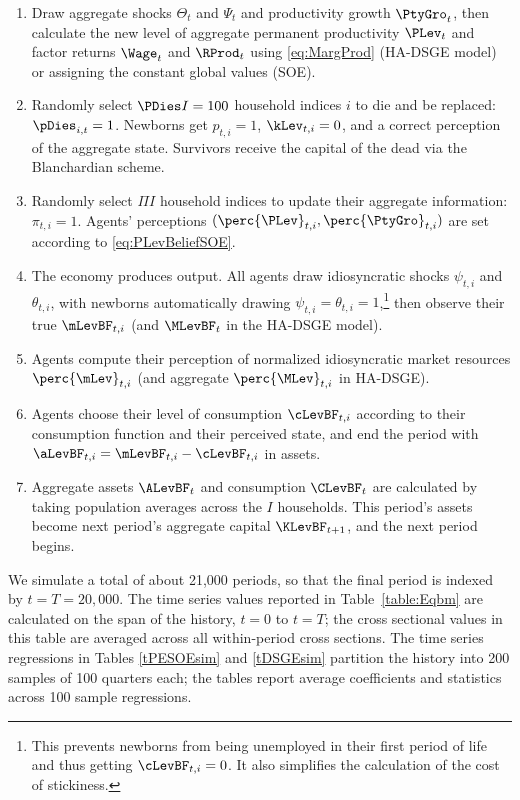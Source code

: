 \begin{enumerate}
\item Draw aggregate shocks $\Theta_t$ and $\Psi_t$ and productivity growth $\PtyGro_t$, then calculate
the new level of aggregate permanent productivity $\PLev_t$ and factor returns $\Wage_t$ and $\RProd_t$
using \eqref{eq:MargProd} (HA-DSGE model) or assigning the constant global values (SOE).

\item Randomly select $\PDies I = 100$ household indices $i$ to die and be replaced: $\pDies_{i,t}=1$.
Newborns get $p_{t,i} = 1$, $\kLev_{t,i} = 0$, and a correct perception of the aggregate state.
Survivors receive the capital of the dead via the Blanchardian scheme.

\item Randomly select $\Pi I$ household indices to update their aggregate information: $\pi_{t,i}=1$.
Agents' perceptions  $(\perc{\PLev}_{t,i},\perc{\PtyGro}_{t,i})$ are set according to \eqref{eq:PLevBeliefSOE}.

\item The economy produces output. All agents draw idiosyncratic shocks $\psi_{t,i}$ and $\theta_{t,i}$,
with newborns automatically drawing $\psi_{t,i} = \theta_{t,i}=1$,\footnote{This prevents newborns from being
unemployed in their first period of life and thus getting $\cLevBF_{t,i}=0$.  It also simplifies the calculation
of the cost of stickiness.} then observe their true $\mLevBF_{t,i}$ (and $\MLevBF_t$ in the HA-DSGE model).

\item Agents compute their perception of normalized idiosyncratic  market resources $\perc{\mLev}_{t,i}$
(and aggregate $\perc{\MLev}_{t,i}$ in HA-DSGE).

\item Agents choose their level of consumption $\cLevBF_{t,i}$ according to their
consumption function and their perceived state, and end the period with $\aLevBF_{t,i} = \mLevBF_{t,i} - \cLevBF_{t,i}$
in assets.

\item Aggregate assets $\ALevBF_t$ and consumption $\CLevBF_t$ are calculated by
taking population averages across the $I$ households.  This period's assets become
next period's aggregate capital $\KLevBF_{t+1}$, and the next period begins.
\end{enumerate}

We simulate a total of about 21,000 periods, so that the final period is indexed
by $t=T=20,000$.  The time series values reported in Table~\ref{table:Eqbm}
are calculated on the span of the history, $t=0$ to $t=T$; the cross sectional
values in this table are averaged across all within-period cross sections.  The
time series regressions in Tables \ref{tPESOEsim} and \ref{tDSGEsim} partition
the history into 200 samples of 100 quarters each; the tables report
average coefficients and statistics across 100 sample regressions.

